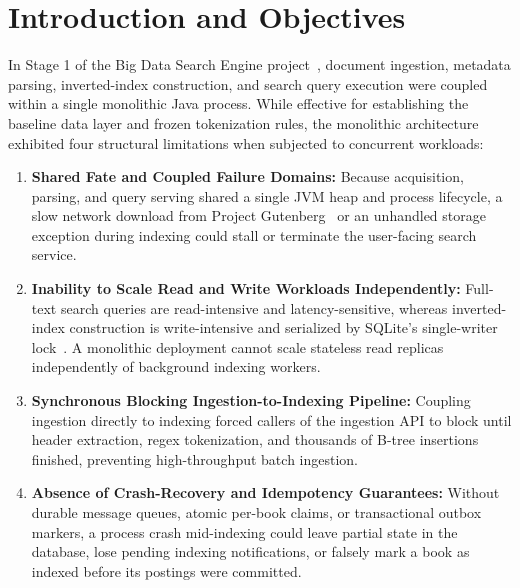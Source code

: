 \documentclass[10pt,a4paper]{article}
\begin{document}
\section{Introduction and Objectives}
\label{sec:introduction}

In Stage 1 of the Big Data Search Engine project~\cite{ulpgc_stage1_spec}, document ingestion, metadata parsing, inverted-index construction, and search query execution were coupled within a single monolithic Java process. While effective for establishing the baseline data layer and frozen tokenization rules, the monolithic architecture exhibited four structural limitations when subjected to concurrent workloads:
\begin{enumerate}[leftmargin=*,nosep]
    \item \textbf{Shared Fate and Coupled Failure Domains:} Because acquisition, parsing, and query serving shared a single JVM heap and process lifecycle, a slow network download from Project Gutenberg~\cite{gutenberg_docs} or an unhandled storage exception during indexing could stall or terminate the user-facing search service.
    \item \textbf{Inability to Scale Read and Write Workloads Independently:} Full-text search queries are read-intensive and latency-sensitive, whereas inverted-index construction is write-intensive and serialized by SQLite's single-writer lock~\cite{sqlite_wal_docs}. A monolithic deployment cannot scale stateless read replicas independently of background indexing workers.
    \item \textbf{Synchronous Blocking Ingestion-to-Indexing Pipeline:} Coupling ingestion directly to indexing forced callers of the ingestion API to block until header extraction, regex tokenization, and thousands of B-tree insertions finished, preventing high-throughput batch ingestion.
    \item \textbf{Absence of Crash-Recovery and Idempotency Guarantees:} Without durable message queues, atomic per-book claims, or transactional outbox markers, a process crash mid-indexing could leave partial state in the database, lose pending indexing notifications, or falsely mark a book as indexed before its postings were committed.
\end{enumerate}
\end{document}
